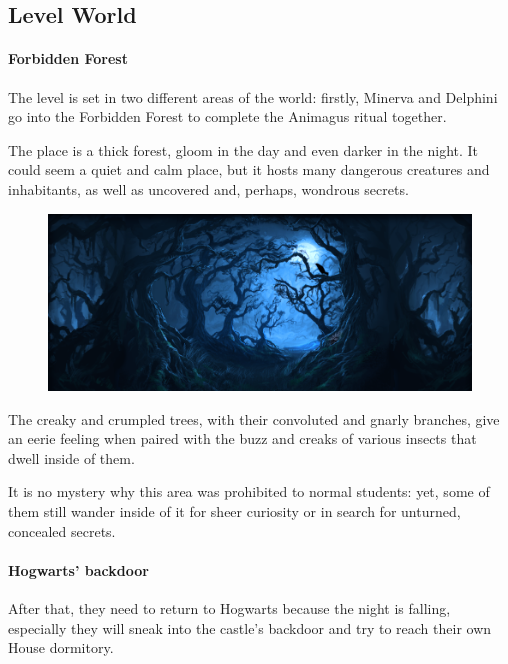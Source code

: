 \pagebreak

\subsection{Level World}

\paragraph{Forbidden Forest}
The level is set in two different areas of the world: firstly, Minerva and Delphini go into the Forbidden Forest to complete the Animagus ritual together. 

The place is a thick forest, gloom in the day and even darker in the night. It could seem a quiet and calm place, but it hosts many dangerous creatures and inhabitants, as well as uncovered and, perhaps, wondrous secrets.

\begin{figure}[H]
\includegraphics[max width=\textwidth]{../Pictures/Level/World/Forbidden_forest_picture.png} 
\end{figure}

The creaky and crumpled trees, with their convoluted and gnarly branches, give an eerie feeling when paired with the buzz and creaks of various insects that dwell inside of them.

It is no mystery why this area was prohibited to normal students: yet, some of them still wander inside of it for sheer curiosity or in search for unturned, concealed secrets.

\paragraph{Hogwarts' backdoor}

After that, they need to return to Hogwarts because the night is falling, especially they will sneak into the castle's backdoor and try to reach their own House dormitory.

